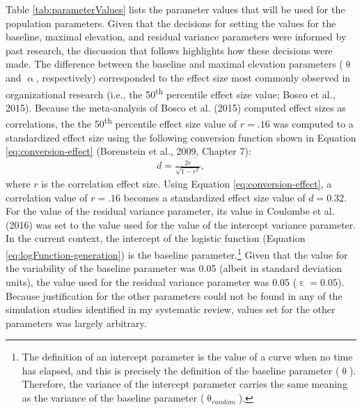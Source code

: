 \documentclass[
12pt, %
twoside,
english]{guelphthesis}
\theoremstyle{definition}
\theoremstyle{definition}
\theoremstyle{definition}
\theoremstyle{definition}
\theoremstyle{remark}
\begin{document}
Table \ref{tab:parameterValues} lists the parameter values that will be
used for the population parameters. Given that the decisions for setting the values for the baseline, maximal elevation, and residual variance parameters were informed by past research, the discussion that follows highlights how these decisions were made. The difference between the baseline and maximal elevation
parameters (\(\uptheta\) and \(\upalpha\), respectively) corresponded to the effect size most commonly observed in organizational research (i.e., the 50\textsuperscript{th} percentile effect size value; Bosco et al., 2015). Because the meta-analysis of Bosco et al. (2015) computed effect sizes as correlations, the the 50\textsuperscript{th} percentile effect size value of \(r = .16\) was computed to a standardized effect size using the following conversion function shown in Equation \ref{eq:conversion-effect} (Borenstein et al., 2009, Chapter 7):
\begin{align}
d = \frac{2r}{\sqrt{1 - r^2}}, 
\label{eq:conversion-effect}
\end{align}
\noindent where \(r\) is the correlation effect size. Using Equation \ref{eq:conversion-effect}, a correlation value of \(r = .16\) becomes a standardized effect size value of \(d = 0.32\). For the value of the residual variance parameter, its value in Coulombe et al. (2016) was set to the value used for the value of the intercept variance parameter. In the current context, the intercept of the logistic function (Equation \ref{eq:logFunction-generation}) is the baseline parameter.\footnote{The definition of an intercept parameter is the value of a curve when no time has elapsed, and this is precisely the definition of the baseline parameter ($\uptheta$). Therefore, the variance of the intercept parameter carries the same meaning as the variance of the baseline parameter ($\uptheta_{random}$).} Given that the value for the variability of the baseline parameter was 0.05 (albeit in standard deviation units), the value used for the residual variance parameter was 0.05 (\(\upepsilon = 0.05\)). Because justification for the other parameters could not be found in any of the simulation studies identified in my systematic review, values set for the other parameters was largely arbitrary.
\end{document}
